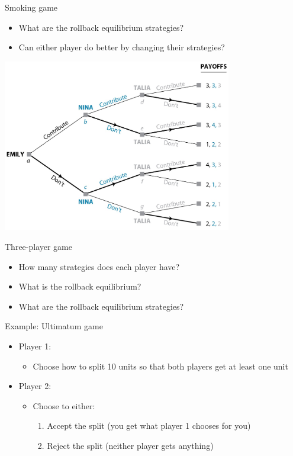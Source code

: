 \documentclass[10pt]{beamer}
\begin{document}
\begin{frame}[label={sec:org0c8b008}]{}
\alert{Smoking game}
\begin{itemize}
\item What are the rollback equilibrium strategies?
\item Can either player do better by changing their strategies?
\end{itemize}
\end{frame}

\begin{frame}[label={sec:orge5b4132}]{}
\begin{center}
\includegraphics[width=0.75\textwidth]{./img/GAMES4_FIG03.06.jpg}
\end{center}
\end{frame}

\begin{frame}[label={sec:orgc7f0b27}]{}
\alert{Three-player game}
\begin{itemize}
\item How many strategies does each player have?
\item What is the rollback equilibrium?
\item What are the rollback equilibrium strategies?
\end{itemize}
\end{frame}

\begin{frame}[label={sec:orgcf7ed20}]{}
\alert{Example: Ultimatum game}
\begin{itemize}
\item Player 1:
\begin{itemize}
\item Choose how to split 10 units so that both players get at least one unit
\end{itemize}
\item Player 2:
\begin{itemize}
\item Choose to either:
\begin{enumerate}
\item Accept the split (you get what player 1 chooses for you)
\item Reject the split (neither player gets anything)
\end{enumerate}
\end{itemize}
\end{itemize}
\end{frame}
\end{document}
